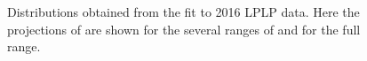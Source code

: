 \begin{figure}[h!]
\caption{Distributions obtained from the fit to 2016 LPLP data. Here the projections of \MJT are shown for the several ranges of \MVV and for the full \MJO range.}
\label{fig:postfitLPLP_Y}
\end{figure}
